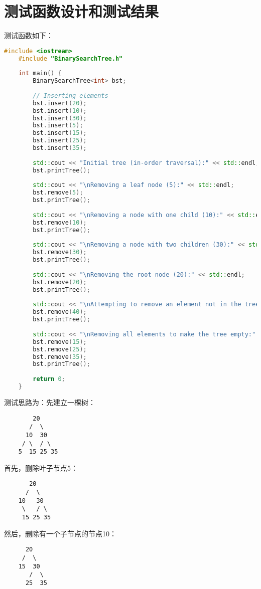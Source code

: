 \documentclass[UTF8]{ctexart}
\begin{document}
\section{测试函数设计和测试结果}
测试函数如下：
\begin{lstlisting}[language=c++]
    #include <iostream>
    #include "BinarySearchTree.h"
    
    int main() {
        BinarySearchTree<int> bst;
    
        // Inserting elements
        bst.insert(20);
        bst.insert(10);
        bst.insert(30);
        bst.insert(5);
        bst.insert(15);
        bst.insert(25);
        bst.insert(35);
    
        std::cout << "Initial tree (in-order traversal):" << std::endl;
        bst.printTree();
    
        std::cout << "\nRemoving a leaf node (5):" << std::endl;
        bst.remove(5);
        bst.printTree();
    
        std::cout << "\nRemoving a node with one child (10):" << std::endl;
        bst.remove(10);
        bst.printTree();
    
        std::cout << "\nRemoving a node with two children (30):" << std::endl;
        bst.remove(30);
        bst.printTree();
    
        std::cout << "\nRemoving the root node (20):" << std::endl;
        bst.remove(20);
        bst.printTree();
    
        std::cout << "\nAttempting to remove an element not in the tree (40):" << std::endl;
        bst.remove(40);
        bst.printTree();
    
        std::cout << "\nRemoving all elements to make the tree empty:" << std::endl;
        bst.remove(15);
        bst.remove(25);
        bst.remove(35);
        bst.printTree();
    
        return 0;
    }
\end{lstlisting}
测试思路为：先建立一棵树：
\begin{lstlisting}
        20
       /  \
      10  30
     / \  / \
    5  15 25 35
\end{lstlisting}
首先，删除叶子节点5：
\begin{lstlisting}
       20
      /  \
    10   30
     \   / \
     15 25 35
\end{lstlisting}
然后，删除有一个子节点的节点10：
\begin{lstlisting}
      20
     /  \
    15  30
       /  \
      25  35
\end{lstlisting}
\end{document}
